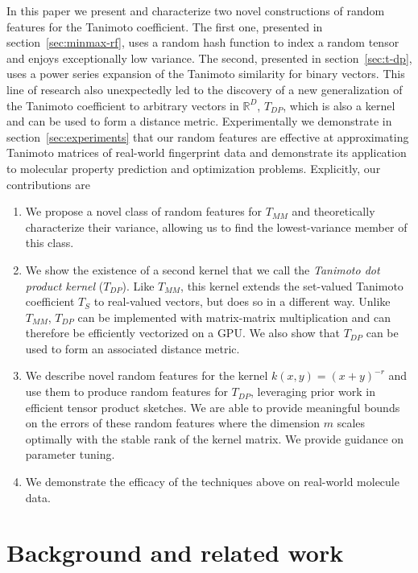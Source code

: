 \documentclass{article}
\theoremstyle{plain}
\theoremstyle{definition}
\theoremstyle{remark}
\begin{document}
In this paper we present and characterize two novel constructions of random features for the Tanimoto coefficient.
The first one, presented in section~\ref{sec:minmax-rf},
uses a random hash function to index a random tensor
and enjoys exceptionally low variance.
The second, presented in section~\ref{sec:t-dp},
uses a power series expansion of the Tanimoto similarity for binary vectors.
This line of research also unexpectedly led to the discovery of a new generalization
of the Tanimoto coefficient to arbitrary vectors in $\mathbb{R}^D$, $T_{DP}$,
which is also a kernel and can be used to form a distance metric.
Experimentally we demonstrate in section~\ref{sec:experiments}
that our random features are effective at approximating
Tanimoto matrices of real-world fingerprint data
and demonstrate its application to molecular property prediction and optimization problems.
Explicitly, our contributions are
\begin{enumerate}
    \item We propose a novel class of random features for $T_{MM}$ and theoretically characterize their variance,
        allowing us to find the lowest-variance member of this class.
    \item We show the existence of a second kernel that we call the \emph{Tanimoto dot product kernel} ($T_{DP}$).
        Like $T_{MM}$, this kernel extends the set-valued Tanimoto coefficient $T_S$
        to real-valued vectors, but does so in a different way.
        Unlike $T_{MM}$, $T_{DP}$ can be implemented with matrix-matrix multiplication
        and can therefore be efficiently vectorized on a GPU.
        We also show that  $T_{DP}$ can be used to form an associated distance metric.
    \item We describe novel random features for the kernel $k(x,y)=\left(x+y\right)^{-r}$
        and use them to produce random features for $T_{DP}$,
        leveraging prior work in efficient tensor product sketches.
        We are able to provide meaningful bounds on the errors of these random features where the dimension $m$ scales optimally with the stable rank of the kernel matrix. We provide
        guidance on parameter tuning.
    \item We demonstrate the efficacy of the techniques above on real-world molecule data.
\end{enumerate}





\section{Background and related work}
\end{document}
